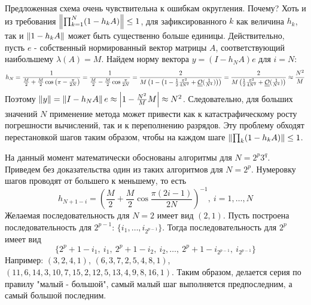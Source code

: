 Предложенная схема очень чувствительна к ошибкам округления. Почему?
Хоть и из требования $\left\lVert\prod_{k=1}^N(1-h_kA)\right\rVert\leq1$,
для зафиксированного $k$ как величина $h_k$, так и $\left\lVert1-h_kA\right\rVert$
может быть существенно больше единицы. Действительно, пусть
$e$ - собственный нормированный вектор матрицы $A$, соответствующий наибольшему $\lambda(A)=M$.
Найдем норму вектора $y=(I-h_NA)e$ для $i=N$:
\[h_N=\frac{1}{\frac{M}{2}+\frac{M}{2}\cos\left(\pi-\frac{\pi}{2N}\right)}=\frac{1}{\frac{M}{2}-\frac{M}{2}\cos\frac{\pi}{2N}}=\frac{2}{M\left(1-\left(1-\frac{1}{2}\frac{\pi^2}{4N^2}+\underline{\underline{\mathcal{O}}}(\frac{1}{N^4})\right)\right)}=\frac{2}{M\left(\frac{1}{2}\frac{\pi^2}{4N^2}+\underline{\underline{\mathcal{O}}}(\frac{1}{N^4})\right)}\approx\frac{N^2}{M}\]
Поэтому $\left\lVert y\right\rVert=\left\lVert I-h_NA\right\rVert e\approx\left\lvert1-\frac{N^2}{M}M\right\rvert\approx N^2$.
Следовательно, для больших значений $N$ применение метода может
привести как к катастрафическому росту погрешности вычислений,
так и к переполнению разрядов. Эту проблему обходят перестановкой шагов
таким образом, чтобы на каждом шаге $\left\lVert\prod_{k}(1-h_kA)\right\rVert\leq1$.

На данный момент математически обоснованы алгоритмы для $N=2^p3^q$.
Приведем без доказательства один из таких алгоритмов для $N=2^p$.
Нумеровку шагов проводят от большего к меньшему, то есть
\[h_{N+1-i}=\left(\frac{M}{2}+\frac{M}{2}\cos\frac{\pi(2i-1)}{2N}\right)^{-1},\ i=1,\ldots,N\]
Желаемая последовательность для $N=2$ имеет вид $(2, 1)$.
Пусть построена последовательность для $2^{p-1}$: $\{i_1,\ldots,i_{2^{p-1}}\}$.
Тогда последовательность для $2^{p}$ имеет вид
\[\{2^p+1-i_1,\ i_1,\ 2^p+1-i_2,\ i_2,\ldots,\ 2^p+1-i_{2^{p-1}},\ i_{2^{p-1}}\}\]
Например: $(3,2,4,1)$, $(6,3,7,2,5,4,8,1)$, $(11,6,14,3,10,7,15,2,12,5,13,4,9,8,16,1)$.
Таким образом, делается серия по правилу "малый - большой", самый малый шаг выполняется предпоследним,
а самый большой последним.
